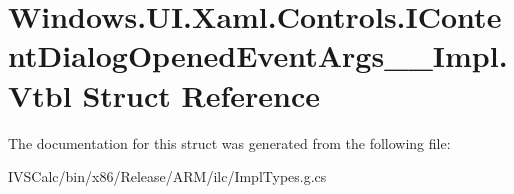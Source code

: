 \hypertarget{struct_windows_1_1_u_i_1_1_xaml_1_1_controls_1_1_i_content_dialog_opened_event_args_____impl_1_1_vtbl}{}\section{Windows.\+U\+I.\+Xaml.\+Controls.\+I\+Content\+Dialog\+Opened\+Event\+Args\+\_\+\+\_\+\+Impl.\+Vtbl Struct Reference}
\label{struct_windows_1_1_u_i_1_1_xaml_1_1_controls_1_1_i_content_dialog_opened_event_args_____impl_1_1_vtbl}


The documentation for this struct was generated from the following file\+:\begin{DoxyCompactItemize}
\item 
I\+V\+S\+Calc/bin/x86/\+Release/\+A\+R\+M/ilc/Impl\+Types.\+g.\+cs\end{DoxyCompactItemize}
